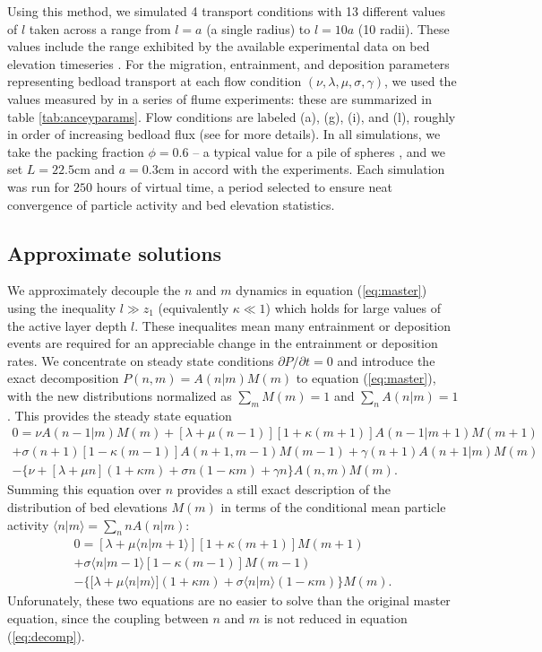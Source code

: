 Using this method, we simulated 4 transport conditions with 13 different values of $l$ taken across a range from $l=a$ (a single radius) to $l=10a$ (10 radii).
These values include the range exhibited by the available experimental data on bed elevation timeseries \citep{Wong2007,Singh2009,Martin2014}.
For the migration, entrainment, and deposition parameters representing bedload transport at each flow condition $(\nu, \lambda, \mu, \sigma, \gamma)$, we used the values measured by \citet{Ancey2008} in a series of flume experiments: these are summarized in table \ref{tab:anceyparams}.
Flow conditions are labeled (a), (g), (i), and (l), roughly in order of increasing bedload flux (see \citet{Ancey2008} for more details). 
In all simulations, we take the packing fraction $\phi = 0.6$ -- a typical value for a pile of spheres \citep[e.g.,][]{Bennett1972}, and we set $L = 22.5$cm and $a = 0.3$cm in accord with the \citet{Ancey2008} experiments.
Each simulation was run for $250$ hours of virtual time, a period selected to ensure neat convergence of particle activity and bed elevation statistics.

\subsection{Approximate solutions}
\label{sec:analytical}

We approximately decouple the $n$ and $m$ dynamics in equation (\ref{eq:master}) using the inequality $l \gg z_1$ (equivalently $\kappa \ll 1$) which holds for large values of the active layer depth $l$. These inequalites mean many entrainment or deposition events are required for an appreciable change in the entrainment or deposition rates.
We concentrate on steady state conditions $\partial P/\partial t = 0$ and introduce the exact decomposition $P(n,m) = A(n|m)M(m)$ to equation (\ref{eq:master}), with the new distributions normalized as $\sum_m M(m)=1$ and $\sum_n A(n|m)=1$.
This provides the steady state equation
\begin{multline}
	0 =  
	\nu A(n-1|m)M(m) + [\lambda + \mu(n-1)][1+\kappa(m+1)]A(n-1|m+1)M(m+1)\\  
	+ \sigma(n+1)[1-\kappa(m-1)]A(n+1,m-1)M(m-1) + \gamma(n+1)A(n+1|m)M(m) \\
	- 
	\{ \nu + [\lambda+ \mu n ](1+\kappa m) +  \sigma n ( 1- \kappa m) + \gamma n \}A(n,m)M(m).
	\label{eq:decomp}
\end{multline}
Summing this equation over $n$ provides a still exact description of the distribution of bed elevations $M(m)$ in terms of the conditional mean particle activity $\langle n | m \rangle = \sum_{n}nA(n|m)$:
\begin{multline}
	0 =  [\lambda + \mu\langle n | m+1\rangle][1+\kappa(m+1)]M(m+1)
	\\+ \sigma\langle n | m-1\rangle[1-\kappa(m-1)]M(m-1) \\
	- 
	\{  [\lambda+ \mu \langle n | m\rangle ](1+\kappa m) +  \sigma  \langle n | m\rangle( 1- \kappa m) \}M(m).
	\label{eq:approxele}
\end{multline}
Unforunately, these two equations are no easier to solve than the original master equation, since the coupling between $n$ and $m$ is not reduced in equation (\ref{eq:decomp}).

